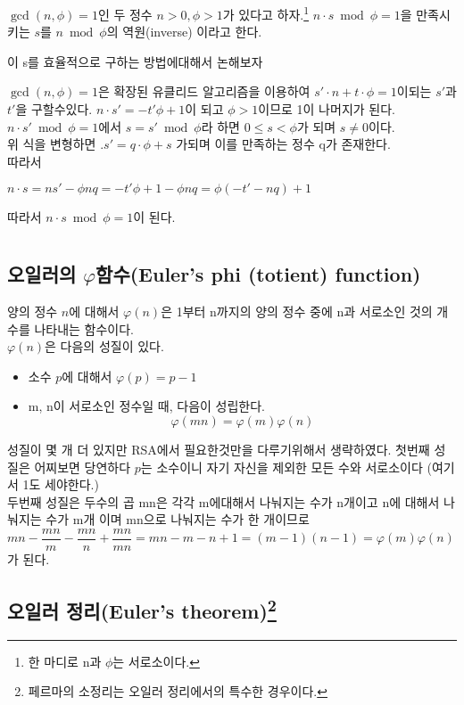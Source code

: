 \documentclass{oblivoir}
\begin{document}
$\gcd(n,\phi)=1$인 두 정수 $n>0, \phi>1$가 있다고 하자.\footnote{한 마디로 n과 $\phi$는 서로소이다.}
$n\cdot s\bmod  \phi =1 $을 만족시키는 $s$를 $n\bmod  \phi$의 역원(inverse) 이라고 한다.\par
이 s를 효율적으로 구하는 방법에대해서 논해보자\par
$\gcd(n,\phi)=1$은 확장된 유클리드 알고리즘을 이용하여 $s'\cdot n + t \cdot \phi = 1$이되는 $s'$과 $t'$을 구할수있다. 
$n\cdot s'= -t'\phi+1$이 되고 $\phi>1$이므로 1이 나머지가 된다.
$n\cdot s'\bmod  \phi =1$에서 $s= s'\bmod  \phi$라 하면 $0 \le s <\phi$가 되며 $s  \ne 0$이다.\\
위 식을 변형하면 .$s'=q\cdot \phi +s$ 가되며 이를 만족하는 정수 q가 존재한다. \\
따라서 
\begin{center}
    $n\cdot s=ns'-\phi nq=-t'\phi +1 -\phi nq=\phi(-t'-nq)+1 $
\end{center}
따라서 $n\cdot s\bmod  \phi =1 $이 된다.

\newpage

\chapter{}

\section{오일러의 $\varphi$함수(Euler’s phi (totient) function)}
양의 정수 $n$에 대해서 $\varphi (n)$은 1부터 n까지의 양의 정수 중에 n과 서로소인 것의 개수를 나타내는 함수이다.\\
$\varphi (n)$은 다음의 성질이 있다.
\begin{itemize}
\item{소수 $p$에 대해서  $\varphi (p)=p-1$}
\item{ m, n이 서로소인 정수일 때, 다음이 성립한다. \[\varphi (mn)=\varphi (m)\varphi (n)\]}
\end{itemize}
성질이 몇 개 더 있지만 RSA에서 필요한것만을 다루기위해서 생략하였다.
첫번째 성질은 어찌보면 당연하다 $p$는 소수이니 자기 자신을 제외한 모든 수와 서로소이다 (여기서 1도 세야한다.)\\
두번째 성질은 두수의 곱 mn은 각각 m에대해서 나눠지는 수가 n개이고 n에 대해서 나눠지는 수가 m개 이며 mn으로 나눠지는 수가 한 개이므로 
$mn -\dfrac{mn}{m}-\dfrac{mn}{n}+\dfrac{mn}{mn} =mn -m -n +1=(m-1)(n-1)=\varphi (m)\varphi(n)$가 된다.

\section{오일러 정리(Euler's theorem)\protect\footnote{페르마의 소정리는 오일러 정리에서의 특수한 경우이다.}}
\end{document}
